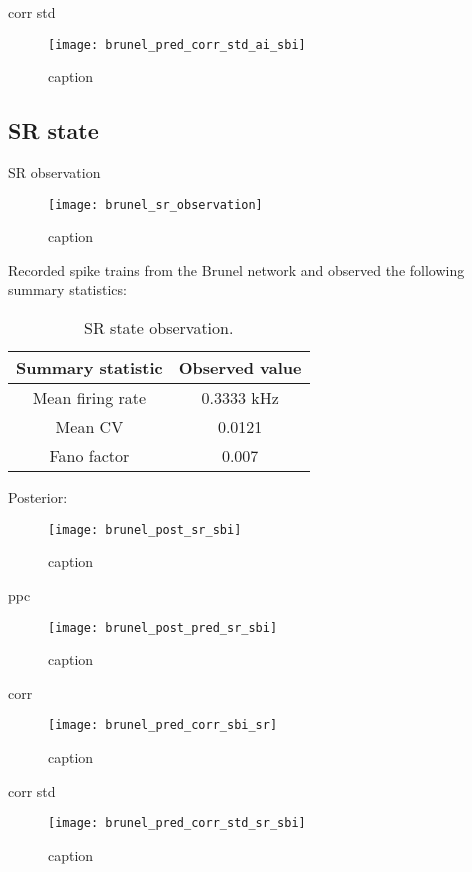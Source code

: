 corr std

\begin{figure}[H]
    \centering
    \texttt{[image: brunel\_pred\_corr\_std\_ai\_sbi]}
    \caption{caption}
    \label{fig:fig1}
\end{figure}

\subsection{SR state}

SR observation

\begin{figure}[H]
    \centering
    \texttt{[image: brunel\_sr\_observation]}
    \caption{caption}
    \label{fig:fig1}
\end{figure}

Recorded spike trains from the Brunel network and observed the following summary statistics:

\begin{table}[H]
  \caption{SR state observation.}
  \begin{center}
    \begin{tabular}{cc}
      \toprule
      \textbf{Summary statistic} & \textbf{Observed value} \\
      \midrule
      Mean firing rate &  0.3333 kHz \\
      Mean CV &  0.0121  \\
      Fano factor & 0.007  \\
      \bottomrule
    \end{tabular}
  \end{center}
  \label{tab:hh_noisy_sumstats}
\end{table}

Posterior:

\begin{figure}[H]
    \centering
    \texttt{[image: brunel\_post\_sr\_sbi]}
    \caption{caption}
    \label{fig:fig1}
\end{figure}

ppc 

\begin{figure}[H]
    \centering
    \texttt{[image: brunel\_post\_pred\_sr\_sbi]}
    \caption{caption}
    \label{fig:fig1}
\end{figure}

corr 

\begin{figure}[H]
    \centering
    \texttt{[image: brunel\_pred\_corr\_sbi\_sr]}
    \caption{caption}
    \label{fig:fig1}
\end{figure}

corr std

\begin{figure}[H]
    \centering
    \texttt{[image: brunel\_pred\_corr\_std\_sr\_sbi]}
    \caption{caption}
    \label{fig:fig1}
\end{figure}

